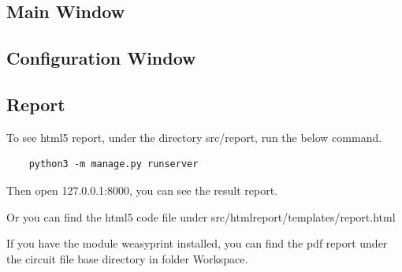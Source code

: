 \documentclass[12pt,a4paper]{article}
\begin{document}
\subsection{Main Window}

\subsection{Configuration Window}

\subsection{Report}
To see html5 report, under the directory src/report, run the below command.
\begin{lstlisting}
    python3 -m manage.py runserver
\end{lstlisting}

Then open 127.0.0.1:8000, you can see the result report.

Or you can find the html5 code file under src/htmlreport/templates/report.html

If you have the module weasyprint installed, you can find the pdf report under the circuit file base directory in folder Workspace.



%
\end{document}
